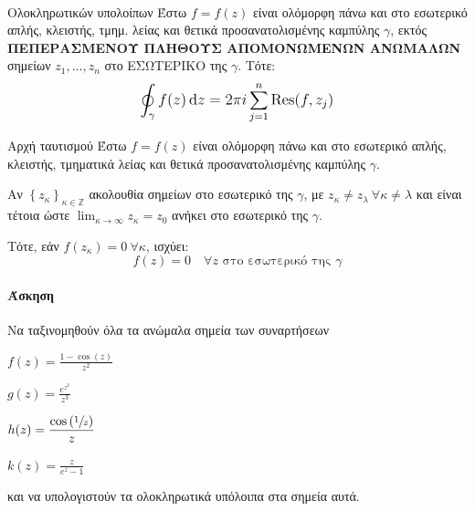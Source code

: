 \documentclass[12pt,a4paper,notitlepage,fleqn]{article}
\begin{document}
    \paragraph{}
    \begin{theorem*}[colbacktitle=red!35!black]{Ολοκληρωτικών υπολοίπων}
    	Έστω \( f = f(z) \) είναι ολόμορφη πάνω και στο εσωτερικό απλής, κλειστής, τμημ.
        λείας και θετικά προσανατολισμένης καμπύλης \( \gamma \), εκτός
        \textbf{ΠΕΠΕΡΑΣΜΕΝΟΥ ΠΛΗΘΟΥΣ ΑΠΟΜΟΝΩΜΕΝΩΝ ΑΝΩΜΑΛΩΝ} σημείων \( z_1,\dots,z_n \)
        στο ΕΣΩΤΕΡΙΚΟ της \( \gamma \). Τότε:
        \[
        \mathlarger{\oint_\gamma f(z) \dif z = 2\pi i \sum_{j=1}^n \Res(f,z_j)}
        \]
    \end{theorem*}

    \begin{theorem*}[colbacktitle=red!35!black]{Αρχή ταυτισμού}
       	Έστω \( f = f(z) \) είναι ολόμορφη πάνω και στο εσωτερικό απλής, κλειστής, τμηματικά
       	λείας και θετικά προσανατολισμένης καμπύλης \( \gamma \).

       	Αν \( \left\lbrace z_\kappa \right\rbrace_{\kappa \in \mathbb Z} \) ακολουθία
       	σημείων στο εσωτερικό της \( \gamma \), με \( z_\kappa \neq z_\lambda \
       	\forall \kappa \neq \lambda \) και είναι τέτοια ώστε
       	\( \displaystyle
       	\lim_{\kappa \to \infty} z_\kappa = z_0\) ανήκει στο εσωτερικό της \( \gamma \).

       	Τότε, εάν \( f(z_\kappa) = 0 \ \forall \kappa \), ισχύει:
       	\[
       	f(z) = 0 \quad \forall z \text{ στο εσωτερικό της } \gamma
       	\]
    \end{theorem*}

    \paragraph{Άσκηση}
    Να ταξινομηθούν όλα τα ανώμαλα σημεία των συναρτήσεων
    \begin{enumlatin}
    	\item \( \displaystyle f(z) = \frac{1-\cos(z)}{z^2} \)
    	\item \( \displaystyle g(z) = \frac{e^{z^2}}{z^3} \)
    	\item \( \displaystyle h(z) =
    	\frac{\cos\left(\sfrac{1}{z} \right)}{z} \)
    	\item \( \displaystyle k(z) = \frac{z}{e^z-1} \)
    \end{enumlatin}
    και να υπολογιστούν τα ολοκληρωτικά υπόλοιπα στα σημεία αυτά.
\end{document}
